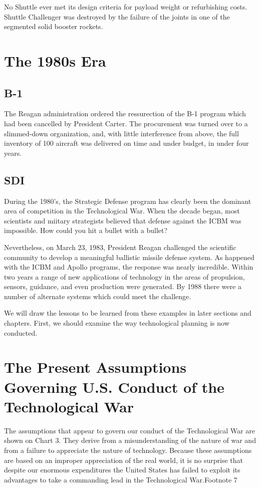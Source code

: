 \documentclass[a4paper,12pt]{book}
\begin{document}
No Shuttle ever met its design criteria for payload weight or refurbishing costs. Shuttle Challenger was destroyed by the failure of the joints in one of the segmented solid booster rockets.

\section{The 1980s Era}
\subsection{B-1}
The Reagan administration ordered the ressurection of the B-1 program which had been cancelled by President Carter. The procurement was turned over to a slimmed-down organization, and, with little interference from above, the full inventory of 100 aircraft was delivered on time and under budget, in under four years.

\subsection{SDI}
During the 1980's, the Strategic Defense program has clearly been the dominant area of competition in the Technological War. When the decade began, most scientists and miitary strategists believed that defense against the ICBM was impossible. How could you hit a bullet with a bullet?

Nevertheless, on March 23, 1983, President Reagan challenged the scientific community to develop a meaningful ballistic missile defense system. As happened with the ICBM and Apollo programs, the response was nearly incredible. Within two years a range of new applications of technology in the areas of propulsion, sensors, guidance, and even production were generated. By 1988 there were a number of alternate systems which could meet the challenge.

We will draw the lessons to be learned from these examples in later sections and chapters. First, we should examine the way technological planning is now conducted.

\section{The Present Assumptions Governing U.S. Conduct of the Technological War}
The assumptions that appear to govern our conduct of the Technological War are shown on Chart 3. They derive from a misunderstanding of the nature of war and from a failure to appreciate the nature of technology. Because these assumptions are based on an improper appreciation of the real world, it is no surprise that despite our enormous expenditures the United States has failed to exploit its advantages to take a commanding lead in the Technological War.Footnote 7
\end{document}

